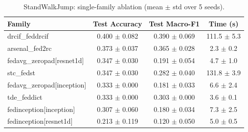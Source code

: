 \begin{table}[t]
\centering
\caption{StandWalkJump: single-family ablation (mean $\pm$ std over 5 seeds).}
\label{tab:results_standwalkjump_ablation}
\begin{tabular}{lccc}
\toprule
Family & Test Accuracy & Test Macro-F1 & Time (s) \\
\midrule
drcif\_feddrcif & 0.400 $\pm$ 0.082 & 0.390 $\pm$ 0.069 & 111.5 $\pm$ 5.3 \\
arsenal\_fed2rc & 0.373 $\pm$ 0.037 & 0.365 $\pm$ 0.028 & 2.3 $\pm$ 0.2 \\
fedavg\_zeropad[resnet1d] & 0.347 $\pm$ 0.030 & 0.191 $\pm$ 0.054 & 4.7 $\pm$ 1.0 \\
stc\_fedst & 0.347 $\pm$ 0.030 & 0.282 $\pm$ 0.040 & 131.8 $\pm$ 3.9 \\
fedavg\_zeropad[inception] & 0.333 $\pm$ 0.000 & 0.181 $\pm$ 0.033 & 6.6 $\pm$ 2.4 \\
tde\_feddict & 0.333 $\pm$ 0.000 & 0.303 $\pm$ 0.000 & 3.6 $\pm$ 0.1 \\
fedinception[inception] & 0.307 $\pm$ 0.060 & 0.180 $\pm$ 0.034 & 7.3 $\pm$ 2.5 \\
fedinception[resnet1d] & 0.213 $\pm$ 0.119 & 0.120 $\pm$ 0.050 & 5.0 $\pm$ 0.5 \\
\bottomrule
\end{tabular}
\end{table}
